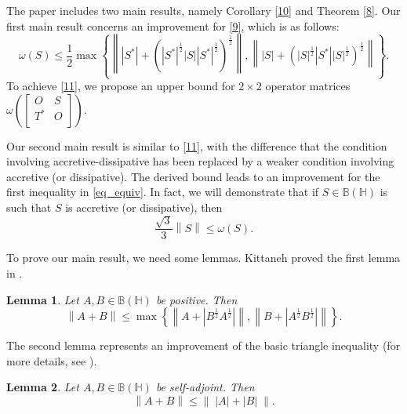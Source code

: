 \documentclass[12pt,twoside,reqno]{amsart}
\newtheorem{lemma}{Lemma}[section]
\numberwithin{equation}{section}
\begin{document}
The paper includes two main results, namely Corollary \ref{10} and Theorem \ref{8}. Our first main result concerns an improvement for \eqref{9}, which is as follows: 
\begin{equation}\label{11}
\omega \left( S \right)\le \frac{1}{2}\max \left\{ \left\| \left| {{S}^{*}} \right|+{{\left( {{\left| {{S}^{*}} \right|}^{\frac{1}{2}}}\left| S \right|\left| {{S}^{*}} \right|^{\frac{1}{2}} \right)}^{\frac{1}{2}}} \right\|,\left\| \left| S \right|+{{\left( {{\left| S \right|}^{\frac{1}{2}}}\left| {{S}^{*}} \right|\left| S \right|^{\frac{1}{2}} \right)}^{\frac{1}{2}}} \right\| \right\}.
\end{equation}
To achieve \eqref{11}, we propose an upper bound for $2 \times 2$ operator matrices $\omega \left( \left[ \begin{matrix}
   O & S  \\
   {{T}^{*}} & O  \\
\end{matrix} \right] \right)$. 

Our second main result is similar to \eqref{11}, with the difference that the condition involving accretive-dissipative has been replaced by a weaker condition involving accretive (or dissipative). The derived bound leads to an improvement for the first inequality in \eqref{eq_equiv}. In fact, we will demonstrate that if $S\in \mathbb B\left( \mathbb H \right)$ is such that $S$ is accretive (or dissipative), then
\[\frac{\sqrt{3}}{3}\left\| S \right\|\le \omega \left( S \right).\]




To prove our main result, we need some lemmas. Kittaneh proved the first lemma in \cite[Corollary 1]{kmy1}.
\begin{lemma}\label{k1}
 Let $A,B\in \mathbb B\left( \mathbb H \right)$ be positive. Then
\begin{equation}
\left\| A+B \right\|\le \max \left\{ \left\| A+\left| {{B}^{\frac{1}{2}}}{{A}^{\frac{1}{2}}} \right| \right\|,\left\| B+\left| {{A}^{\frac{1}{2}}}{{B}^{\frac{1}{2}}} \right| \right\| \right\}.
\end{equation}	
\end{lemma}





The second lemma represents an improvement of the basic triangle inequality (for more details, see \cite[p. 27]{batia-princ}).
\begin{lemma}\label{2}
Let $A,B\in \mathbb B\left( \mathbb H \right)$ be self-adjoint. Then
\[\left\| A+B \right\|\le \left\| \;\left| A \right|+\left| B \right| \;\right\|.\]
\end{lemma}
\end{document}
